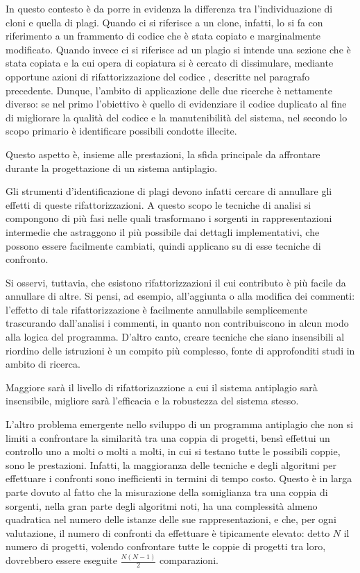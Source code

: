 In questo contesto è da porre in evidenza la differenza tra l'individuazione di cloni e quella di plagi.
%
Quando ci si riferisce a un clone, infatti, lo si fa con riferimento a un frammento di codice che è stata copiato e marginalmente modificato. 
%
Quando invece ci si riferisce ad un plagio si intende una sezione che è stata copiata e la cui opera di copiatura si è cercato di dissimulare, mediante opportune azioni di rifattorizzazione del codice \cite{cpdp}, descritte nel paragrafo precedente.
%
Dunque, l'ambito di applicazione delle due ricerche è nettamente diverso: se nel primo l'obiettivo è quello di evidenziare il codice duplicato al fine di migliorare la qualità del codice e la manutenibilità del sistema, nel secondo lo scopo primario è identificare possibili condotte illecite.

Questo aspetto è, insieme alle prestazioni, la sfida principale da affrontare durante la progettazione di un sistema antiplagio.

Gli strumenti d'identificazione di plagi devono infatti cercare di annullare gli effetti di queste rifattorizzazioni.
%
A questo scopo le tecniche di analisi si compongono di più fasi nelle quali trasformano i sorgenti in rappresentazioni intermedie che astraggono il più possibile dai dettagli implementativi, che possono essere facilmente cambiati, quindi applicano su di esse tecniche di confronto.

Si osservi, tuttavia, che esistono rifattorizzazioni il cui contributo è più facile da annullare di altre. 
%
Si pensi, ad esempio, all'aggiunta o alla modifica dei commenti: l'effetto di tale rifattorizzazione è facilmente annullabile semplicemente trascurando dall'analisi i commenti, in quanto non contribuiscono in alcun modo alla logica del programma. 
%
D'altro canto, creare tecniche che siano insensibili al riordino delle istruzioni è un compito più complesso, fonte di approfonditi studi in ambito di ricerca.

Maggiore sarà il livello di rifattorizazzione a cui il sistema antiplagio sarà insensibile, migliore sarà l'efficacia e la robustezza del sistema stesso.

L'altro problema emergente nello sviluppo di un programma antiplagio che non si limiti a confrontare la similarità tra una coppia di progetti, bensì effettui un controllo uno a molti o molti a molti, in cui si testano tutte le possibili coppie, sono le prestazioni. 
%
Infatti, la maggioranza delle tecniche e degli algoritmi per effettuare i confronti sono inefficienti in termini di tempo costo. 
%
Questo è in larga parte dovuto al fatto che la misurazione della somiglianza tra una coppia di sorgenti, nella gran parte degli algoritmi noti, ha una complessità almeno quadratica nel numero delle istanze delle sue rappresentazioni, e che, per ogni valutazione, il numero di confronti da effettuare è tipicamente elevato: detto $N$ il numero di progetti, volendo confrontare tutte le coppie di progetti tra loro, dovrebbero essere eseguite $\frac{N(N-1)}{2}$ comparazioni.

